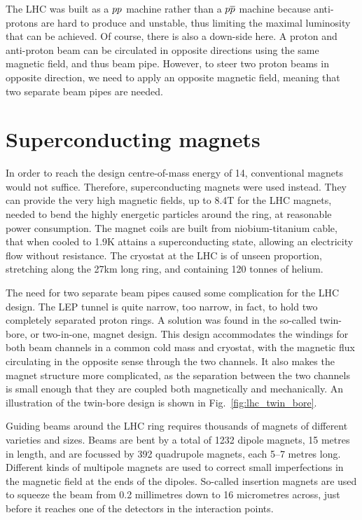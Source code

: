 The LHC was built as a ${p}{p}$ machine rather than a ${p}{\overline{p}}$ machine because anti-protons are
hard to produce and unstable, thus limiting the maximal luminosity that can be achieved. Of course,
there is also a down-side here. A proton and anti-proton beam can be circulated in opposite
directions using the same magnetic field, and thus beam pipe. However, to steer two proton beams in
opposite direction, we need to apply an opposite magnetic field, meaning that two separate beam
pipes are needed. 


\section{Superconducting magnets}

In order to reach the design centre-of-mass energy of 14\TeV, conventional magnets would not
suffice. Therefore, superconducting magnets were used instead. They can provide the very high
magnetic fields, up to 8.4\unit{T} for the LHC magnets, needed to bend the highly energetic
particles around the ring, at reasonable power consumption. The magnet coils are built from
niobium-titanium
cable, that when cooled to 1.9\unit{K} attains a superconducting state, allowing an electricity flow
without resistance. The cryostat at the LHC is of unseen proportion, stretching along the
27\unit{km} long ring, and containing 120 tonnes of helium.

The need for two separate beam pipes caused some complication for the LHC design. The LEP tunnel is
quite narrow, too narrow, in fact, to hold two completely separated proton rings. A solution was
found in the so-called twin-bore, or two-in-one, magnet design. This design accommodates the
windings for both beam channels in a common cold mass and cryostat, with the magnetic flux
circulating in the opposite sense through the two channels. 
It also makes the magnet structure more complicated, as the separation between the two channels is
small enough that they are coupled both magnetically and mechanically. An illustration of the
twin-bore design is shown in Fig.~\ref{fig:lhc_twin_bore}. 

Guiding beams around the LHC ring requires thousands of magnets of different varieties and sizes.
Beams are bent by a total of 1232 dipole magnets, 15 metres in length, and are focussed by 392
quadrupole magnets, each 5–7 metres long. Different kinds of multipole magnets are used to correct
small imperfections in the magnetic field at the ends of the dipoles. So-called insertion magnets
are used to squeeze the beam from 0.2 millimetres down to 16 micrometres across, just before it
reaches one of the detectors in the interaction points. 

